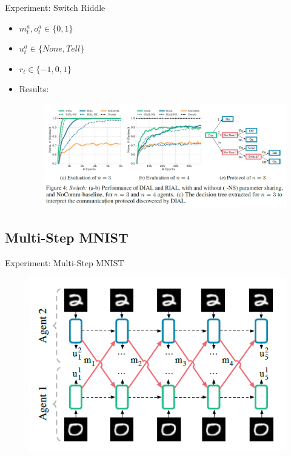\documentclass[mathserif]{beamer}
\begin{document}
\begin{frame}{Experiment: Switch Riddle}
  \begin{itemize}
    \item $m_{t}^{a},o_{t}^{a}\in\{0,1\}$
    \item $u_{t}^{a}\in\{None,Tell\}$
    \item $r_{t}\in\{-1,0,1\}$
    \item Results:
    \begin{figure}
      \centering
      \includegraphics[scale=0.4]{fig/6}
    \end{figure}
  \end{itemize}
\end{frame}
\subsection{Multi-Step MNIST}
\begin{frame}{Experiment: Multi-Step MNIST}
  \begin{figure}
    \centering
    \includegraphics[scale=0.8]{fig/8}
  \end{figure}
\end{frame}
\end{document}

